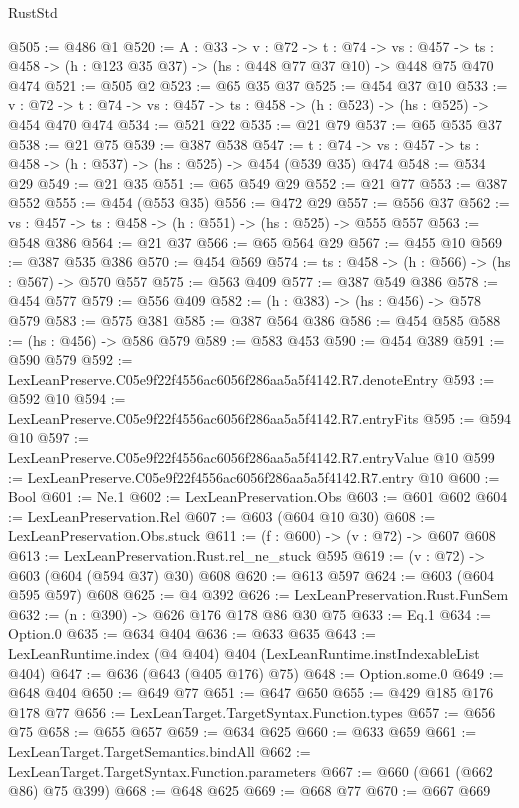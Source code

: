\begin{lexlean}{RustStd}
\begin{coremodule}
@505 := @486 @1
@520 := {A : @33} ->
  {v : @72} ->
  {t : @74} ->
  {vs : @457} -> {ts : @458} -> (h : @123 @35 @37) -> (hs : @448 @77 @37 @10) -> @448 @75 @470 @474
@521 := @505 @2
@523 := @65 @35 @37
@525 := @454 @37 @10
@533 := {v : @72} ->
  {t : @74} -> {vs : @457} -> {ts : @458} -> (h : @523) -> (hs : @525) -> @454 @470 @474
@534 := @521 @22
@535 := @21 @79
@537 := @65 @535 @37
@538 := @21 @75
@539 := @387 @538
@547 := {t : @74} -> {vs : @457} -> {ts : @458} -> (h : @537) -> (hs : @525) -> @454 (@539 @35) @474
@548 := @534 @29
@549 := @21 @35
@551 := @65 @549 @29
@552 := @21 @77
@553 := @387 @552
@555 := @454 (@553 @35)
@556 := @472 @29
@557 := @556 @37
@562 := {vs : @457} -> {ts : @458} -> (h : @551) -> (hs : @525) -> @555 @557
@563 := @548 @386
@564 := @21 @37
@566 := @65 @564 @29
@567 := @455 @10
@569 := @387 @535 @386
@570 := @454 @569
@574 := {ts : @458} -> (h : @566) -> (hs : @567) -> @570 @557
@575 := @563 @409
@577 := @387 @549 @386
@578 := @454 @577
@579 := @556 @409
@582 := (h : @383) -> (hs : @456) -> @578 @579
@583 := @575 @381
@585 := @387 @564 @386
@586 := @454 @585
@588 := (hs : @456) -> @586 @579
@589 := @583 @453
@590 := @454 @389
@591 := @590 @579
@592 := LexLeanPreserve.C05e9f22f4556ac6056f286aa5a5f4142.R7.denoteEntry
@593 := @592 @10
@594 := LexLeanPreserve.C05e9f22f4556ac6056f286aa5a5f4142.R7.entryFits
@595 := @594 @10
@597 := LexLeanPreserve.C05e9f22f4556ac6056f286aa5a5f4142.R7.entryValue @10
@599 := LexLeanPreserve.C05e9f22f4556ac6056f286aa5a5f4142.R7.entry @10
@600 := Bool
@601 := Ne.{1}
@602 := LexLeanPreservation.Obs
@603 := @601 @602
@604 := LexLeanPreservation.Rel
@607 := @603 (@604 @10 @30)
@608 := LexLeanPreservation.Obs.stuck
@611 := (f : @600) -> (v : @72) -> @607 @608
@613 := LexLeanPreservation.Rust.rel_ne_stuck @595
@619 := (v : @72) -> @603 (@604 (@594 @37) @30) @608
@620 := @613 @597
@624 := @603 (@604 @595 @597) @608
@625 := @4 @392
@626 := LexLeanPreservation.Rust.FunSem
@632 := (n : @390) -> @626 @176 @178 @86 @30 @75
@633 := Eq.{1}
@634 := Option.{0}
@635 := @634 @404
@636 := @633 @635
@643 := LexLeanRuntime.index (@4 @404) @404 (LexLeanRuntime.instIndexableList @404)
@647 := @636 (@643 (@405 @176) @75)
@648 := Option.some.{0}
@649 := @648 @404
@650 := @649 @77
@651 := @647 @650
@655 := @429 @185 @176 @178 @77
@656 := LexLeanTarget.TargetSyntax.Function.types
@657 := @656 @75
@658 := @655 @657
@659 := @634 @625
@660 := @633 @659
@661 := LexLeanTarget.TargetSemantics.bindAll
@662 := LexLeanTarget.TargetSyntax.Function.parameters
@667 := @660 (@661 (@662 @86) @75 @399)
@668 := @648 @625
@669 := @668 @77
@670 := @667 @669

\end{coremodule}
\end{lexlean}
